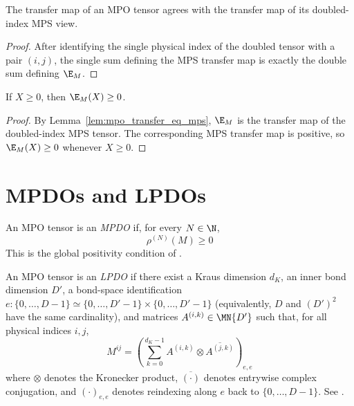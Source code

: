 \begin{lemma}\label{lem:mpo_transfer_eq_mps}
    \leanok
    The transfer map of an MPO tensor agrees with the transfer map of its
    doubled-index MPS view.
\end{lemma}

\begin{proof}
    \leanok
    After identifying the single physical index of the doubled tensor with a
    pair $(i,j)$, the single sum defining the MPS transfer map is exactly the
    double sum defining $\E_M$.
\end{proof}

\begin{theorem}\label{thm:mpo_transfer_pos}
    \leanok
    If $X \ge 0$, then $\E_M(X) \ge 0$.
\end{theorem}

\begin{proof}
    \leanok
    By Lemma~\ref{lem:mpo_transfer_eq_mps}, $\E_M$ is the transfer map of the
    doubled-index MPS tensor. The corresponding MPS transfer map is positive,
    so $\E_M(X) \ge 0$ whenever $X \ge 0$.
\end{proof}

\section{MPDOs and LPDOs}

\begin{definition}[MPDO]\label{def:mpdo}
    \leanok
    An MPO tensor is an \emph{MPDO} if, for every $N \in \N$,
    \[
        \rho^{(N)}(M) \ge 0
    \]
    This is the global positivity condition of \cite[Section~4]{Cirac2016MPDO_arXiv}.
\end{definition}

\begin{definition}[LPDO]\label{def:lpdo}
    \leanok
    An MPO tensor is an \emph{LPDO} if there exist a Kraus dimension $d_K$,
    an inner bond dimension $D'$, a bond-space identification
    $e : \{0, \ldots, D - 1\} \simeq \{0, \ldots, D' - 1\} \times \{0, \ldots, D' - 1\}$
    (equivalently, $D$ and $(D')^2$
    have the same cardinality), and matrices $A^{(i,k)} \in \MN{D'}$ such that,
    for all physical indices $i,j$,
    \[
        M^{ij}
        = \left(\sum_{k=0}^{d_K-1} A^{(i,k)} \otimes \overline{A^{(j,k)}}\right)_{e,e}
    \]
    where $\otimes$ denotes the Kronecker product, $\overline{(\cdot)}$
    denotes entrywise complex conjugation, and $(\cdot)_{e,e}$ denotes
    reindexing along $e$ back to $\{0, \ldots, D - 1\}$.
    See \cite[Section~4.3]{Cirac2016MPDO_arXiv}.
\end{definition}

